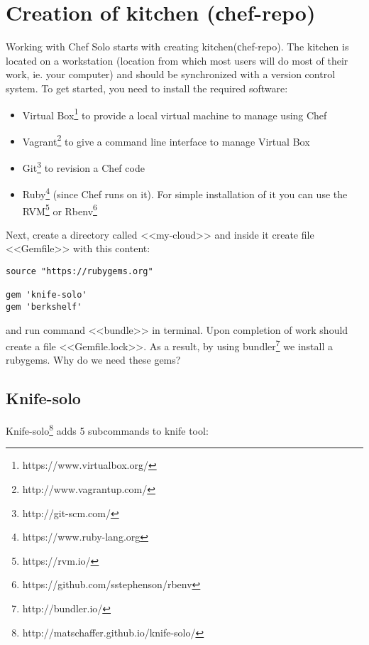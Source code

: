 \section{Creation of kitchen (сhef-repo)}

Working with Chef Solo starts with creating kitchen(сhef-repo). The kitchen is located on a workstation (location from which most users will do most of their work, ie. your computer) and should be synchronized with a version control system. To get started, you need to install the required software:

\begin{itemize}
  \item Virtual Box\footnote{https://www.virtualbox.org/} to provide a local virtual machine to manage using Chef
  \item Vagrant\footnote{http://www.vagrantup.com/} to give a command line interface to manage Virtual Box
  \item Git\footnote{http://git-scm.com/} to revision a Chef code
  \item Ruby\footnote{https://www.ruby-lang.org} (since Chef runs on it). For simple installation of it you can use the RVM\footnote{https://rvm.io/} or Rbenv\footnote{https://github.com/sstephenson/rbenv}
\end{itemize}

Next, create a directory called <<my-cloud>> and inside it create file <<Gemfile>> with this content:

\begin{lstlisting}[label=lst:my-cloud-kitchen1,title=my-cloud/Gemfile]
source "https://rubygems.org"

gem 'knife-solo'
gem 'berkshelf'
\end{lstlisting}

and run command <<bundle>> in terminal. Upon completion of work should create a file <<Gemfile.lock>>. As a result, by using bundler\footnote{http://bundler.io/} we install a rubygems. Why do we need these gems?

\subsection{Knife-solo}

Knife-solo\footnote{http://matschaffer.github.io/knife-solo/} adds 5 subcommands to knife tool:


